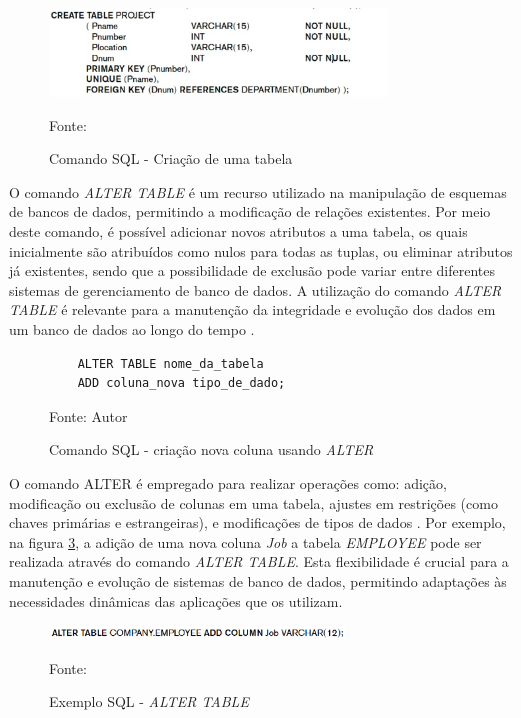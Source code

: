 \begin{figure}[H]
    \centering
    \includegraphics[width=0.8\textwidth]{figuras/create_table_elmasi.eps}
    \caption{Comando SQL - Criação de uma tabela}
    Fonte: \cite{elmasri2011fundamentals}
    \label{fig:create_table}
\end{figure}



O comando \textit{ALTER TABLE} é um recurso utilizado na manipulação de esquemas de bancos de dados, permitindo a modificação de relações existentes. Por meio deste comando, é possível adicionar novos atributos a uma tabela, os quais inicialmente são atribuídos como nulos para todas as tuplas, ou eliminar atributos já existentes, sendo que a possibilidade de exclusão pode variar entre diferentes sistemas de gerenciamento de banco de dados. A utilização do comando \textit{ALTER TABLE} é relevante para a manutenção da integridade e evolução dos dados em um banco de dados ao longo do tempo \cite{silberschatz2011database}.


\begin{figure}[H]
    \centering
    \begin{lstlisting}
    ALTER TABLE nome_da_tabela
    ADD coluna_nova tipo_de_dado;
    \end{lstlisting}
    \caption{Comando SQL - criação nova coluna usando \textit{ALTER}}
    Fonte: Autor
    \label{lst:sql_alter}
\end{figure}


O comando ALTER é empregado para realizar  operações como:  adição, modificação ou exclusão de colunas em uma tabela, ajustes em restrições (como chaves primárias e estrangeiras), e modificações de tipos de dados \cite{silberschatz2011database}. Por exemplo, na figura \ref{fig:alter_table}, a adição de uma nova coluna \textit{Job} a tabela \textit{EMPLOYEE} pode ser realizada através do comando \textit{ALTER TABLE}. Esta flexibilidade é crucial para a manutenção e evolução de sistemas de banco de dados, permitindo adaptações às necessidades dinâmicas das aplicações que os utilizam.

\begin{figure}[H]
    \centering
    \includegraphics[width=0.7\textwidth]{figuras/alter_table_elmasi.eps}
    \caption{Exemplo SQL - \textit{ALTER TABLE}}
    Fonte: \cite{elmasri2011fundamentals}
    \label{fig:alter_table}
\end{figure}

